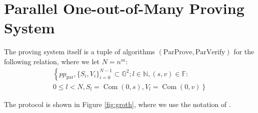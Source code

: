 \documentclass{llncs}
\newcommand{\G}{\mathbb{G}}
\newcommand{\F}{\mathbb{F}}
\newcommand{\com}{\operatorname{Com}}
\begin{document}
\section{Parallel One-out-of-Many Proving System}
\label{app:parallel}

The proving system itself is a tuple of algorithms $(\text{ParProve},\text{ParVerify})$ for the following relation, where we let $N = n^m$:
\begin{multline*}
\left\{ pp_{\text{par}}, \{S_i,V_i\}_{i=0}^{N-1} \subset \G^2 ; l \in \mathbb{N}, (s,v) \in \F : \right. \\
\left. 0 \leq l < N, S_l = \com(0,s), V_l = \com(0,v) \right\}
\end{multline*}

The protocol is shown in Figure \ref{fig:groth}, where we use the notation of \cite{lelantus}.
\end{document}
